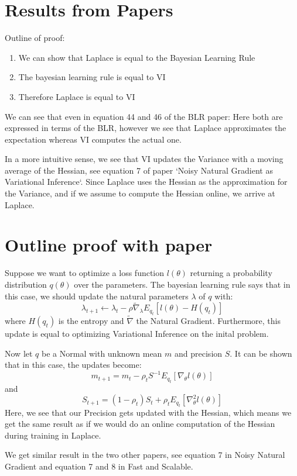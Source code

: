 \documentclass[a4paper]{scrartcl}
\begin{document}
  \section{Results from Papers}
      Outline of proof:
      \begin{enumerate}
        \item We can show that Laplace is equal to the Bayesian Learning Rule
        \item The bayesian learning rule is equal to VI 
        \item Therefore Laplace is equal to VI
      \end{enumerate}

      We can see that even in equation 44 and 46 of the BLR paper: Here both are
      expressed in terms of the BLR, however we see that Laplace approximates
      the expectation whereas VI computes the actual one.

      In a more intuitive sense, we see that VI updates the Variance with a
      moving average of the Hessian, see equation 7 of paper `Noisy Natural
      Gradient as Variational Inference`. Since Laplace uses the Hessian as the
      approximation for the Variance, and if we assume to compute the Hessian
      online, we arrive at Laplace.

  \section{Outline proof with paper}
    Suppose we want to optimize a loss function $l(\theta)$ returning a
    probability distribution $q(\theta)$ over the parameters. The bayesian
    learning rule says that in this case, we should update the natural
    parameters $\lambda$ of $q$ with:
    \begin{equation}
      \lambda_{t+1} \leftarrow \lambda_{t} - \rho \tilde{\nabla}_\lambda E_{q_t}[l(\theta) - H(q_t)]
    \end{equation}
    where $H(q_t)$ is the entropy and $\tilde{\nabla}$ the Natural Gradient.
    Furthermore, this update is equal to optimizing Variational Inference on the
    inital problem.

    Now let $q$ be a Normal with unknown mean $m$ and precision $S$. It can be shown that
    in this case, the updates become:
    \begin{equation}
      m_{t+1} = m_t - \rho_t S^{-1} E_{q_t} [\nabla_\theta l(\theta)]
    \end{equation}
    and 
    \begin{equation}
      S_{t+1} = (1 - \rho_t) S_t + \rho_t E_{q_t}[\nabla^2_\theta l(\theta)]
    \end{equation}
    Here, we see that our Precision gets updated with the Hessian, which means
    we get the same result as if we would do an online computation of the
    Hessian during training in Laplace.

    We get similar result in the two other papers, see equation 7 in Noisy
    Natural Gradient and equation 7 and 8 in Fast and Scalable.
\end{document}
